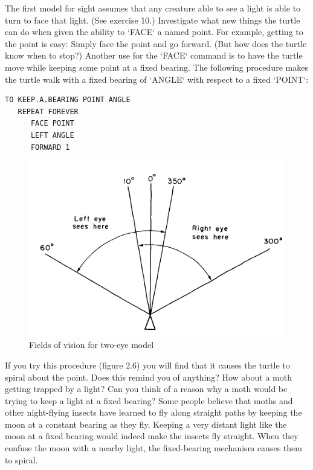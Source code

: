 \documentclass{book}
\begin{document}
The first model for sight assumes that any creature able to see a light is
able to turn to face that light. (See exercise 10.) Investigate what new
things the turtle can do when given the ability to \textsc{`FACE`} a named point.
For example, getting to the point is easy: Simply face the point and go
forward. (But how does the turtle know when to stop?) Another use for
the \textsc{`FACE`} command is to have the turtle move while keeping some point
at a fixed bearing. The following procedure makes the turtle walk with
a fixed bearing of \textsc{`ANGLE`} with respect to a fixed \textsc{`POINT`}:

\begin{verbatim}
TO KEEP.A.BEARING POINT ANGLE
   REPEAT FOREVER
      FACE POINT
      LEFT ANGLE
      FORWARD 1
\end{verbatim}

\begin{figure}
\begin{center}
\includegraphics[scale=1]{fig2-7}
\caption{Fields of vision for two-eye model}
\end{center}
\end{figure}

If you try this procedure (figure 2.6) you will find that it causes the
turtle to spiral about the point. Does this remind you of anything? How
about a moth getting trapped by a light? Can you think of a reason
why a moth would be trying to keep a light at a fixed bearing? Some
people believe that moths and other night-flying insects have learned to
fly along straight paths by keeping the moon at a constant bearing as
they fly. Keeping a very distant light like the moon at a fixed bearing
would indeed make the insects fly straight. When they confuse the moon
with a nearby light, the fixed-bearing mechanism causes them to spiral.
\end{document}
